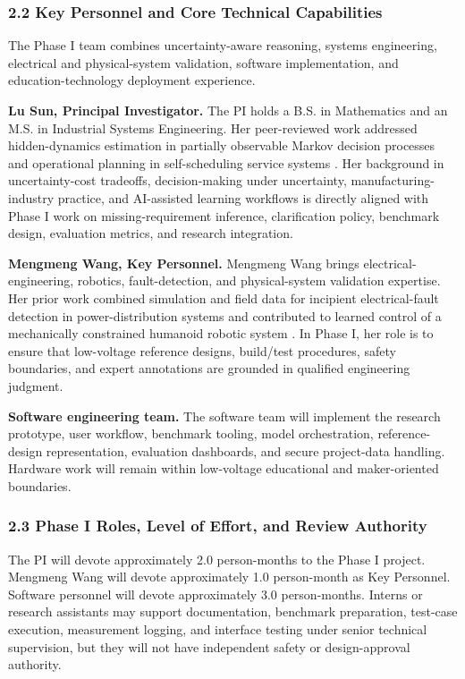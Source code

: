 \subsubsection*{2.2 Key Personnel and Core Technical Capabilities}

The Phase I team combines uncertainty-aware reasoning, systems engineering, electrical and physical-system validation, software implementation, and education-technology deployment experience.

\textbf{Lu Sun, Principal Investigator.} The PI holds a B.S. in Mathematics and an M.S. in Industrial Systems Engineering. Her peer-reviewed work addressed hidden-dynamics estimation in partially observable Markov decision processes and operational planning in self-scheduling service systems \cite{chang2023pomdp,chang2021uniform}. Her background in uncertainty-cost tradeoffs, decision-making under uncertainty, manufacturing-industry practice, and AI-assisted learning workflows is directly aligned with Phase I work on missing-requirement inference, clarification policy, benchmark design, evaluation metrics, and research integration.

\textbf{Mengmeng Wang, Key Personnel.} Mengmeng Wang brings electrical-engineering, robotics, fault-detection, and physical-system validation expertise. Her prior work combined simulation and field data for incipient electrical-fault detection in power-distribution systems and contributed to learned control of a mechanically constrained humanoid robotic system \cite{chen2022incipient,hu2026lipmotions}. In Phase I, her role is to ensure that low-voltage reference designs, build/test procedures, safety boundaries, and expert annotations are grounded in qualified engineering judgment.

\textbf{Software engineering team.} The software team will implement the research prototype, user workflow, benchmark tooling, model orchestration, reference-design representation, evaluation dashboards, and secure project-data handling. Hardware work will remain within low-voltage educational and maker-oriented boundaries.

\subsubsection*{2.3 Phase I Roles, Level of Effort, and Review Authority}

The PI will devote approximately 2.0 person-months to the Phase I project. Mengmeng Wang will devote approximately 1.0 person-month as Key Personnel. Software personnel will devote approximately 3.0 person-months. Interns or research assistants may support documentation, benchmark preparation, test-case execution, measurement logging, and interface testing under senior technical supervision, but they will not have independent safety or design-approval authority.

